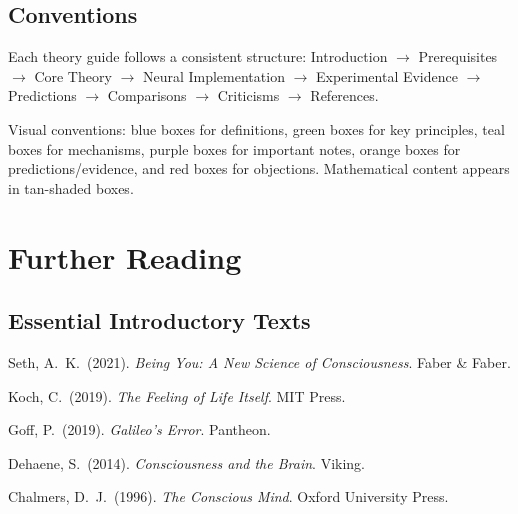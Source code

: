\documentclass[11pt,a4paper]{report}
\begin{document}
\section{Conventions}

Each theory guide follows a consistent structure: Introduction $\to$ Prerequisites $\to$ Core Theory $\to$ Neural Implementation $\to$ Experimental Evidence $\to$ Predictions $\to$ Comparisons $\to$ Criticisms $\to$ References.

Visual conventions: \textcolor{defcolor}{blue boxes} for definitions, \textcolor{principlecolor}{green boxes} for key principles, \textcolor{mechcolor}{teal boxes} for mechanisms, \textcolor{notepurple}{purple boxes} for important notes, \textcolor{predcolor}{orange boxes} for predictions/evidence, and \textcolor{objcolor}{red boxes} for objections. Mathematical content appears in tan-shaded boxes.


\chapter{Further Reading}

\section*{Essential Introductory Texts}
\begin{enumerate}[label={[\arabic*]}, leftmargin=2.5em]
  \item Seth, A.\ K.\ (2021). \textit{Being You: A New Science of Consciousness}. Faber \& Faber.
  \item Koch, C.\ (2019). \textit{The Feeling of Life Itself}. MIT Press.
  \item Goff, P.\ (2019). \textit{Galileo's Error}. Pantheon.
  \item Dehaene, S.\ (2014). \textit{Consciousness and the Brain}. Viking.
  \item Chalmers, D.\ J.\ (1996). \textit{The Conscious Mind}. Oxford University Press.
\end{enumerate}
\end{document}
